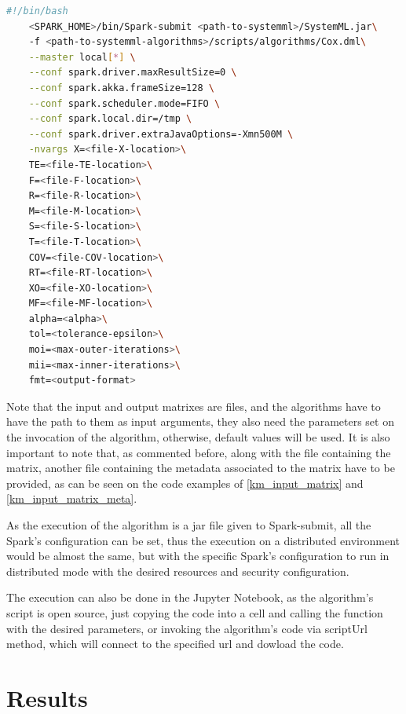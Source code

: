 \documentclass[11pt]{book} %
\begin{document}
    \begin{lstlisting}[label=code:km-invocation-Spark, language=sh, caption=Example of the invocation of the Cox Proportional Hazard model with Apache SystemML over an Apache Spark framework]
    #!/bin/bash
    <SPARK_HOME>/bin/Spark-submit <path-to-systemml>/SystemML.jar\
    -f <path-to-systemml-algorithms>/scripts/algorithms/Cox.dml\
    --master local[*] \
    --conf spark.driver.maxResultSize=0 \
    --conf spark.akka.frameSize=128 \
    --conf spark.scheduler.mode=FIFO \
    --conf spark.local.dir=/tmp \
    --conf spark.driver.extraJavaOptions=-Xmn500M \
    -nvargs X=<file-X-location>\
    TE=<file-TE-location>\
    F=<file-F-location>\
    R=<file-R-location>\
    M=<file-M-location>\
    S=<file-S-location>\
    T=<file-T-location>\
    COV=<file-COV-location>\
    RT=<file-RT-location>\
    XO=<file-XO-location>\
    MF=<file-MF-location>\
    alpha=<alpha>\
    tol=<tolerance-epsilon>\
    moi=<max-outer-iterations>\
    mii=<max-inner-iterations>\
    fmt=<output-format>
    \end{lstlisting}

    Note that the input and output matrixes are files, and the algorithms have to have the path to them as input arguments, they also need the parameters set on the invocation of the algorithm, otherwise, default values will be used. It is also important to note that, as commented before, along with the file containing the matrix, another file containing the metadata associated to the matrix have to be provided, as can be seen on the code examples of \ref{km_input_matrix} and \ref{km_input_matrix_meta}.

    As the execution of the algorithm is a jar file given to Spark-submit, all the Spark's configuration can be set, thus the execution on a distributed environment would be almost the same, but with the specific Spark's configuration to run in distributed mode with the desired resources and security configuration.

    The execution can also be done in the Jupyter Notebook, as the algorithm's script is open source, just copying the code into a cell and calling the function with the desired parameters, or invoking the algorithm's code via scriptUrl method, which will connect to the specified url and dowload the code.

  \newpage

  \section{Results}
\end{document}

